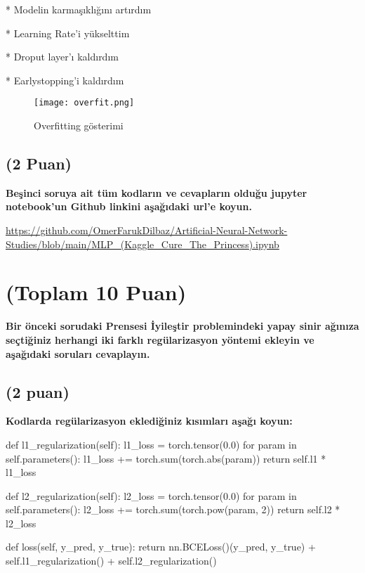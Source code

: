 \documentclass[11pt]{article}
\begin{document}
    * Modelin karmaşıklığını artırdım
    
    * Learning Rate'i yükselttim
    
    * Droput layer'ı kaldırdım
    
    * Earlystopping'i kaldırdım
    

\begin{figure}[h]
  \centering
  \shorthandoff{=}
  \texttt{[image: overfit.png]}
  \shorthandoff{=}
  \caption[Şekil 5]{Overfitting gösterimi}
\end{figure}



\subsection{(2 Puan)} \textbf{Beşinci soruya ait tüm kodların ve cevapların olduğu jupyter notebook'un Github linkini aşağıdaki url'e koyun.}

\url{https://github.com/OmerFarukDilbaz/Artificial-Neural-Network-Studies/blob/main/MLP_(Kaggle_Cure_The_Princess).ipynb}

\section{(Toplam 10 Puan)} \textbf{Bir önceki sorudaki Prensesi İyileştir problemindeki yapay sinir ağınıza seçtiğiniz herhangi iki farklı regülarizasyon yöntemi ekleyin ve aşağıdaki soruları cevaplayın.} 

\subsection{(2 puan)} \textbf{Kodlarda regülarizasyon eklediğiniz kısımları aşağı koyun:} 

\begin{python}
def l1_regularization(self):
        l1_loss = torch.tensor(0.0)
        for param in self.parameters():
            l1_loss += torch.sum(torch.abs(param))
        return self.l1 * l1_loss

    def l2_regularization(self):
        l2_loss = torch.tensor(0.0)
        for param in self.parameters():
            l2_loss += torch.sum(torch.pow(param, 2))
        return self.l2 * l2_loss

    def loss(self, y_pred, y_true):
        return nn.BCELoss()(y_pred, y_true) + self.l1_regularization() + self.l2_regularization()
\end{python}
\end{document}
